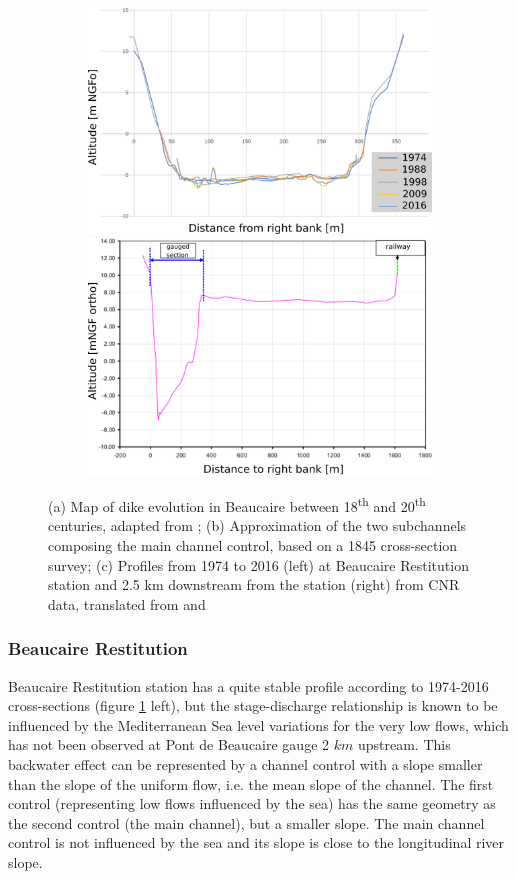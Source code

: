 \documentclass[11pt]{article}
\begin{document}
\begin{figure}[h!]
            \begin{subfigure}{.9\linewidth}
            \includegraphics[width=.48\linewidth]{Figs/3c-ProfilsBardRestit.png}
            \includegraphics[width=.48\linewidth]{Figs/3c-ProfilAvalRestitEN.png}
            \caption{}
            \label{subfig:avalprofilesRestit}
            \end{subfigure}
            
            \caption{(a) Map of dike evolution in Beaucaire between 18\textsuperscript{th} and 20\textsuperscript{th} centuries, adapted from \citet{armand_ii_1907}; (b) Approximation of the two subchannels composing the main channel control, based on a 1845 cross-section survey; (c) Profiles from 1974 to 2016 (left) at Beaucaire Restitution station and 2.5 km downstream from the station (right) from CNR data, translated from \citet{bard_actualisation_2018} and \citet{medd_debit_2005}}
            \label{fig:groupPriorPt}
        \end{figure}


        \subsubsection{Beaucaire Restitution}
        
        Beaucaire Restitution station has a quite stable profile according to 1974-2016 cross-sections (figure \ref{subfig:avalprofilesRestit} left), but the stage-discharge relationship is known to be influenced by the Mediterranean Sea level variations for the very low flows, which has not been observed at Pont de Beaucaire gauge 2 $km$ upstream. This backwater effect can be represented by a channel control with a slope smaller than the slope of the uniform flow, i.e. the mean slope of the channel. The first control (representing low flows influenced by the sea) has the same geometry as the second control (the main channel), but a smaller slope. The main channel control is not influenced by the sea and its slope is close to the longitudinal river slope. 
\end{document}

